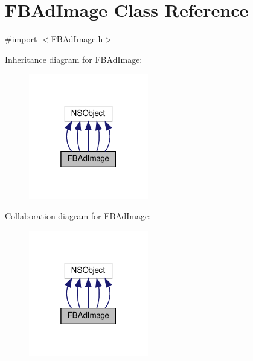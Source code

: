 \hypertarget{interfaceFBAdImage}{}\section{F\+B\+Ad\+Image Class Reference}
\label{interfaceFBAdImage}


{\ttfamily \#import $<$F\+B\+Ad\+Image.\+h$>$}



Inheritance diagram for F\+B\+Ad\+Image\+:
\nopagebreak
\begin{figure}[H]
\begin{center}
\leavevmode
\includegraphics[width=148pt]{interfaceFBAdImage__inherit__graph}
\end{center}
\end{figure}


Collaboration diagram for F\+B\+Ad\+Image\+:
\nopagebreak
\begin{figure}[H]
\begin{center}
\leavevmode
\includegraphics[width=148pt]{interfaceFBAdImage__coll__graph}
\end{center}
\end{figure}
